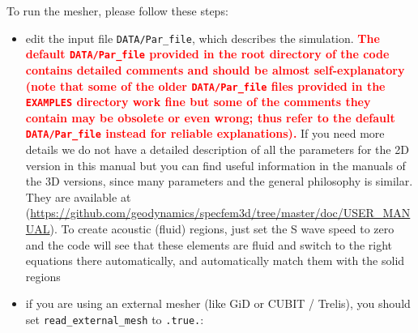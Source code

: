 \documentclass[oneside,english,onecolumn,letterpaper]{book}
\newcommand{\urlwithparentheses}[1]{(\url{#1})}
\newcommand{\red}[1]{\textbf{\textcolor{Red}{#1}}}
\begin{document}
To run the mesher, please follow these steps:
%
\begin{itemize}

\item edit the input file \texttt{DATA/Par\_file}, which describes the simulation.
\red{\textbf{The default \texttt{DATA/Par\_file} provided in the root directory of the code contains detailed comments and should be almost self-explanatory
(note that some of the older \texttt{DATA/Par\_file} files provided in the \texttt{EXAMPLES} directory work fine but some of the comments
they contain may be obsolete or even wrong; thus refer to the default \texttt{DATA/Par\_file} instead for reliable explanations).}}
If you need more details we do not have a detailed description of all the parameters for the 2D version in this manual
but you can find useful information in the manuals of the 3D versions, since many parameters and the general philosophy is similar. They are available at
\urlwithparentheses{https://github.com/geodynamics/specfem3d/tree/master/doc/USER_MANUAL}.
To create acoustic (fluid) regions, just set the S wave speed to zero and the code will see that these elements are fluid and switch to the right equations there automatically, and automatically match them with the solid regions

\item if you are using an external mesher (like GiD or CUBIT / Trelis), you should set \texttt{read\_external\_mesh} to \texttt{.true.}:
\end{itemize}
\end{document}
